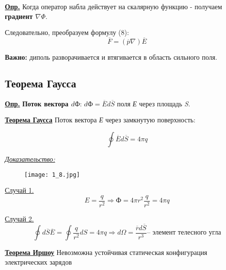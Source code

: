 \colorbox{faded}{\underline{\textbf{Опр.}}} Когда оператор набла действует на скалярную функцию - получаем \textbf{градиент $\nabla \Phi$}.

Следовательно, преобразуем формулу (8):
\begin{equation}\label{opr10}
\overline{F} = (\overline{p} \nabla) \overline{E}
\end{equation}

\textbf{Важно:} диполь разворачивается и втягивается в область сильного поля.

\subsection{Теорема Гаусса}

\colorbox{faded}{\underline{\textbf{Опр.}}} \textbf{Поток вектора $d \text{Ф}$}: $d \text{Ф} = \overline{E} d \overline{S}$ поля \textit{Е} через площадь \textit{S}.

\colorbox{faded}{\underline{\textbf{Теорема Гаусса}}} Поток вектора \textit{Е} через замкнутую поверхность:

\begin{equation}\label{opr10}
  \oint \overline{E} d \overline{S} = 4 \pi q
\end{equation}

\underline{\textit{Доказательство:}}

\begin{figure}[!ht]
\centering
 \texttt{[image: 1\_8.jpg]}     
 \label{fig:my_label}
 \caption{}
\end{figure}

\underline{Случай 1.} 
$$E = \frac{q}{r^2} \Rightarrow \text{Ф} = 4 \pi r^2 \frac{q}{r^2} = 4 \pi q$$

\underline{Случай 2.} 
$$\oint d \overline{S} \overline{E} = \oint \frac{q}{r^2}  d S = 4 \pi q
\Rightarrow d \Omega = \frac{\overline{r} d \overline{S}}{r^3} \text{-- элемент телесного угла}$$

\colorbox{faded}{\underline{\textbf{Теорема Иршоу}}} Невозможна устойчивая статическая конфигурация электрических зарядов
